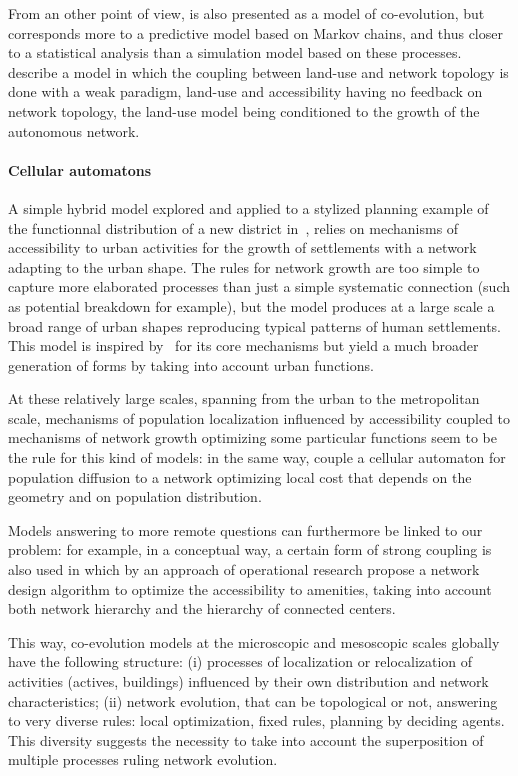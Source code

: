 \documentclass[11pt]{article}
\begin{document}
From an other point of view, \citep{levinson2005paving} is also presented as a model of co-evolution, but corresponds more to a predictive model based on Markov chains, and thus closer to a statistical analysis than a simulation model based on these processes. \cite{rui2011urban} describe a model in which the coupling between land-use and network topology is done with a weak paradigm, land-use and accessibility having no feedback on network topology, the land-use model being conditioned to the growth of the autonomous network.




\paragraph{Cellular automatons}


A simple hybrid model explored and applied to a stylized planning example of the functionnal distribution of a new district in~\citep{raimbault2014hybrid}, relies on mechanisms of accessibility to urban activities for the growth of settlements with a network adapting to the urban shape. The rules for network growth are too simple to capture more elaborated processes than just a simple systematic connection (such as potential breakdown for example), but the model produces at a large scale a broad range of urban shapes reproducing typical patterns of human settlements. This model is inspired by~\citep{moreno2012automate} for its core mechanisms but yield a much broader generation of forms by taking into account urban functions.


At these relatively large scales, spanning from the urban to the metropolitan scale, mechanisms of population localization influenced by accessibility coupled to mechanisms of network growth optimizing some particular functions seem to be the rule for this kind of models: in the same way, \cite{wu2017city} couple a cellular automaton for population diffusion to a network optimizing local cost that depends on the geometry and on population distribution.


Models answering to more remote questions can furthermore be linked to our problem: for example, in a conceptual way, a certain form of strong coupling is also used in \citep{bigotte2010integrated} which by an approach of operational research propose a network design algorithm to optimize the accessibility to amenities, taking into account both network hierarchy and the hierarchy of connected centers.


This way, co-evolution models at the microscopic and mesoscopic scales globally have the following structure: (i) processes of localization or relocalization of activities (actives, buildings) influenced by their own distribution and network characteristics; (ii) network evolution, that can be topological or not, answering to very diverse rules: local optimization, fixed rules, planning by deciding agents. This diversity suggests the necessity to take into account the superposition of multiple processes ruling network evolution.
\end{document}
